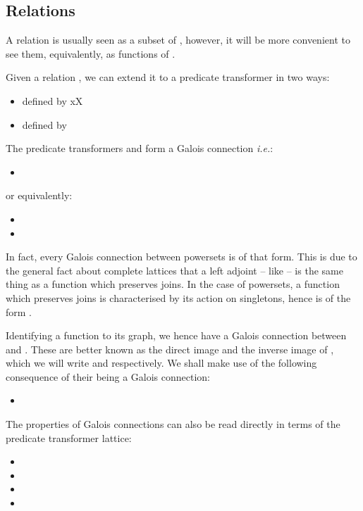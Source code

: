 \documentclass[]{llncs}
\begin{document}
\subsection{Relations}
\par
A relation is usually seen as a subset of , however, it will be more convenient to see them, equivalently, as functions of .
\par
Given a relation , we can extend it to a predicate transformer in two ways:
  \begin{itemize}
    \item  defined by xX
    \item  defined by 
  \end{itemize}
  The predicate transformers  and  form a Galois connection \emph{i.e.}:
  \begin{itemize}
    \item 
  \end{itemize}
  or equivalently:
  \begin{itemize}
    \item 
    \item 
  \end{itemize}
  In fact, every Galois connection between powersets is of that form. This is due to the general fact about complete lattices that a left adjoint -- like  -- is the same thing as a function which preserves joins. In the case of powersets, a function which preserves joins is characterised by its action on singletons, hence is of the form .
\par
Identifying a function  to its graph, we hence have a Galois connection between  and . These are better known as the direct image and the inverse image of , which we will write  and  respectively. We shall make use of the following consequence of their being a Galois connection:
  \begin{itemize}
    \item 
  \end{itemize}
\par
The properties of Galois connections can also be read directly in terms of the predicate transformer lattice:
  \begin{itemize}
    \item 
    \item 
    \item 
    \item 
  \end{itemize}
\end{document}
